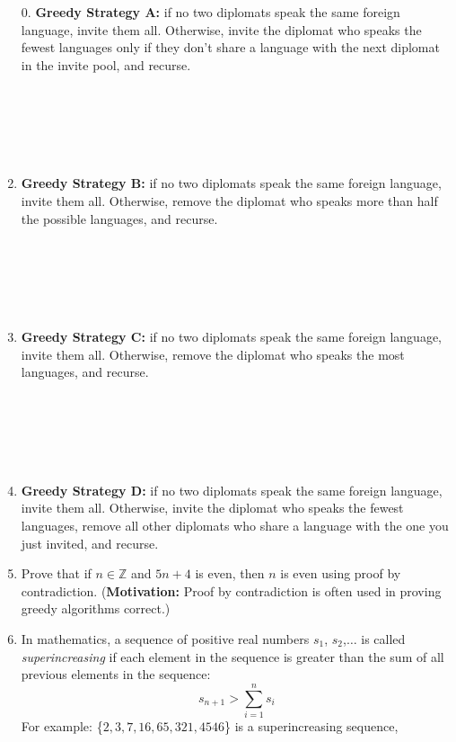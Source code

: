 \documentclass[12pt]{article}
\begin{document}
    \begin{enumerate}
    \item[0.] \textbf{Greedy Strategy A:} if no two diplomats 
    speak the same foreign language, invite them all. 
    Otherwise, invite the diplomat who speaks the fewest 
    languages only if they don't share a language with
    the next diplomat in the invite pool, and recurse.\\\\\\\\\\\\
    \item \textbf{Greedy Strategy B:} if no two diplomats 
    speak the same foreign language, invite them all. 
    Otherwise, remove the diplomat who speaks 
    more than half the possible languages, and recurse.\\\\\\\\\\\\
    \item \textbf{Greedy Strategy C:} if no two diplomats 
    speak the same foreign language, invite them all. Otherwise,
    remove the diplomat who speaks the most languages, and recurse.\\\\\\\\\\\\
    \item \textbf{Greedy Strategy D:} if no two diplomats speak the 
    same foreign language, invite them all. Otherwise,
    invite the diplomat who speaks the fewest languages, 
    remove all other diplomats who share a language
    with the one you just invited, and recurse.
    \newpage
    \item Prove that if $n \in \mathbb{Z}$ and $5n+4$ is even, then $n$ is even using proof by contradiction.
    (\textbf{Motivation: }Proof by contradiction is often used in proving greedy algorithms correct.)
    \newpage 
    \item In mathematics, a sequence of positive real numbers 
    $s_1$, $s_2$,$\dots$ is called \textit{superincreasing} if each element
    in the sequence is greater than the sum of all previous elements in the sequence:
    $$s_{n+1} > \sum\limits_{i=1}^{n}s_i$$
    For example: \{$2,3,7,16,65,321,4546$\} is a superincreasing sequence, 

\end{enumerate}
\end{document}

